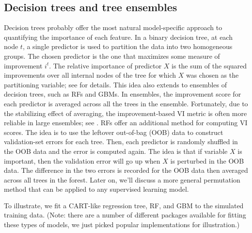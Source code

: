 \subsection{Decision trees and tree ensembles}

Decision trees probably offer the most natural model-specific approach
to quantifying the importance of each feature. In a binary decision
tree, at each node \(t\), a single predictor is used to partition the
data into two homogeneous groups. The chosen predictor is the one that
maximizes some measure of improvement \(i^t\). The relative importance
of predictor \(X\) is the sum of the squared improvements over all
internal nodes of the tree for which \(X\) was chosen as the
partitioning variable; see \citet{classification-breiman-1984} for
details. This idea also extends to ensembles of decision trees, such as
RFs and GBMs. In ensembles, the improvement score for each predictor is
averaged across all the trees in the ensemble. Fortunately, due to the
stabilizing effect of averaging, the improvement-based VI metric is
often more reliable in large ensembles; see
\citet[p. 368]{hastie-elements-2009}. RFs offer an additional method for
computing VI scores. The idea is to use the leftover out-of-bag (OOB)
data to construct validation-set errors for each tree. Then, each
predictor is randomly shuffled in the OOB data and the error is computed
again. The idea is that if variable \(X\) is important, then the
validation error will go up when \(X\) is perturbed in the OOB data. The
difference in the two errors is recorded for the OOB data then averaged
across all trees in the forest. Later on, we'll discuss a more general
permutation method that can be applied to any supervised learning model.

To illustrate, we fit a CART-like regression tree, RF, and GBM to the
simulated training data. (Note: there are a number of different packages
available for fitting these types of models, we just picked popular
implementations for illustration.)

\begin{Schunk}
\end{Schunk}

